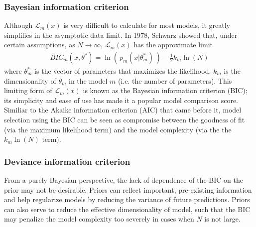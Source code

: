 \documentclass{article}
\begin{document}
\subsubsection{Bayesian information criterion}
Although $\mathcal{L}_m(x)$ is very difficult to calculate for most models, it greatly simplifies in the asymptotic data limit. In 1978, Schwarz showed that, under certain assumptions, as $N \rightarrow \infty$, $\mathcal{L}_m(x)$  has the approximate limit
\begin{align}
BIC_m(x,\theta^*) = \ln (\, p_m(x|\theta_m^*) \,) - \frac{1}{2}k_m\ln(N) 
\end{align}
where $\theta_m^*$ is the vector of parameters that maximizes the likelihood. $k_m$ is the dimensionality of $\theta_m$ in the model $m$  (i.e. the number of parameters). This limiting form of $\mathcal{L}_m(x)$ is known as the Bayesian information criterion (BIC); its simplicity and ease of use has made it a popular model comparison score. Similiar to the Akaike information criterion (AIC) that came before it, model selection using the BIC can be seen as compromise between the goodness of fit (via the maximum likelihood term) and the model complexity (via the the $k_m\ln(N)$ term). 

\subsubsection{Deviance information criterion}
From a purely Bayesian perspective, the lack of dependence of the BIC on the prior may not be desirable. Priors can reflect important, pre-existing information and help regularize models by reducing the variance of future predictions. Priors can also serve to reduce the effective dimensionality of model, such that the BIC may penalize the model complexity too severely in cases when $N$ is not large. 
\end{document}
